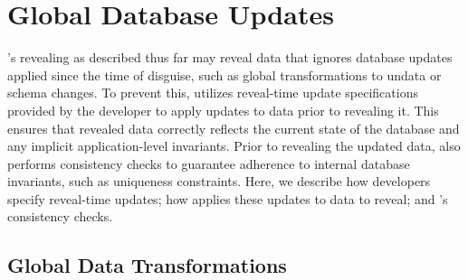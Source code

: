 \section{Global Database Updates}
\label{s:design:database-updates}
\sys's revealing as described thus far may reveal data that ignores
database updates applied since the time of disguise, such as global
transformations to un\xxed data or schema changes.
%
To prevent this, \sys utilizes reveal-time update specifications provided by the
developer to apply updates to \xxed data prior to revealing it. This ensures
that revealed data correctly reflects the current state of the database and any
implicit application-level invariants.
%
Prior to revealing the updated data, \sys also performs consistency checks
to guarantee adherence to internal database invariants, such as uniqueness
constraints.
%
Here, we describe how developers specify reveal-time updates; how \sys applies
these updates to data to reveal; and \sys's consistency checks.

%
\subsection{Global Data Transformations}
\label{s:design:updates}

